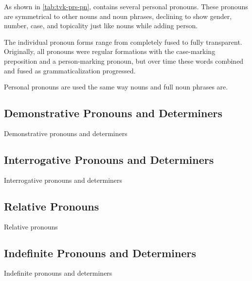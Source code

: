 As shown in \autoref{tab:tvk-prs-pn}, \langtvk{} contains several personal pronouns. These pronouns are symmetrical to other nouns and noun phrases\autocite{wals-50}, declining to show gender, number, case, and topicality just like nouns while adding person.

The individual pronoun forms range from completely fused to fully transparent. Originally, all pronouns were regular formations with the case-marking preposition and a person-marking pronoun, but over time these words combined and fused as grammaticalization progressed.

Personal pronouns are used the same way nouns and full noun phrases are.

\subsection{Demonstrative Pronouns and Determiners}
\label{subsec:tvk-demonstrative-pronouns-determiners}

Demonstrative pronouns and determiners

\subsection{Interrogative Pronouns and Determiners}
\label{subsec:tvk-interrogative-pronouns-determiners}

Interrogative pronouns and determiners

\subsection{Relative Pronouns}
\label{subsec:tvk-relative-pronouns}

Relative pronouns

\subsection{Indefinite Pronouns and Determiners}
\label{subsec:tvk-indefinite-pronouns-determiners}

Indefinite pronouns and determiners
